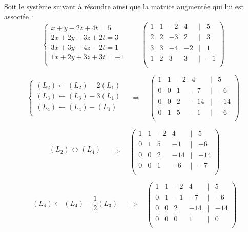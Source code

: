 \documentclass[10pt]{article}
\begin{document}
\begin{exemple}
Soit le système suivant à résoudre ainsi que la matrice augmentée qui lui est associée : 
$$
\left\{
\begin{array}{l}
x   + y  -2 z +4t = 5 \\
2x + 2y -3 z +2t = 3 \\
3x + 3y -4 z -2t = 1 \\
1x + 2y +3 z +3t = -1 \\
\end{array}
\right.
\quad\quad
\begin{pmatrix}
1 & 1 & -2 & 4 & | & 5 \\
2 & 2 & -3 & 2 & | &  3 \\
3 & 3 & -4 &  -2& | & 1 \\
1 & 2 & 3 & 3 & | & -1 \\
\end{pmatrix}
$$

$$
\left\{
\begin{array}{l}
(L_2) \leftarrow (L_2) - 2 (L_1) \\ 
(L_3) \leftarrow (L_3) - 3 (L_1) \\
(L_4) \leftarrow (L_4) -  (L_1) \\
\end{array}
\right.
\quad\Longrightarrow \quad
\begin{pmatrix}
1 & 1 & -2 & 4 & | & 5 \\
0 & 0 & 1 & -7 & | &  -6 \\
0 & 0 & 2 &  -14& | & -14 \\
0 & 1 & 5 & -1 & | & -6 \\
\end{pmatrix}
$$

$$
\begin{array}{l}
(L_2) \leftrightarrow (L_4)  \\ 
\end{array}
\quad\Longrightarrow \quad
\begin{pmatrix}
1 & 1 & -2 & 4 & | & 5 \\
0 & 1 & 5 & -1 & | & -6 \\
0 & 0 & 2 &  -14& | & -14 \\
0 & 0 & 1 & -6 & | &  -7 \\
\end{pmatrix}
$$

$$
\begin{array}{l}
(L_4) \leftarrow (L_4) - \dfrac{1}{2} (L_3)\\ 
\end{array}
\quad\Longrightarrow \quad
\begin{pmatrix}
1 & 1 & -2 & 4 & | & 5 \\
0 & 1 & -1 & -7 & | & -6 \\
0 & 0 & 2 &  -14& | & -14 \\
0 & 0 & 0 & 1 & | &  0 \\
\end{pmatrix}
$$
\end{exemple}
\end{document}
